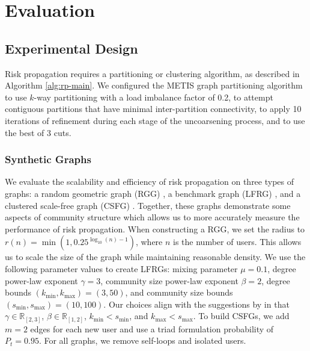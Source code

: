 \chapter{Evaluation}\label{sec:evaluation}

\section{Experimental Design}

\par Risk propagation requires a partitioning or clustering algorithm, as described in Algorithm \ref{alg:rp-main}. We configured the METIS graph partitioning algorithm \cite{Karypis1998} to use $k$-way partitioning with a load imbalance factor of 0.2, to attempt contiguous partitions that have minimal inter-partition connectivity, to apply 10 iterations of refinement during each stage of the uncoarsening process, and to use the best of 3 cuts.

\subsection{Synthetic Graphs}\label{sec:synthetic-eval}

\par We evaluate the scalability and efficiency of risk propagation on three types of graphs: a random geometric graph (RGG) \cite{Dall2002}, a benchmark graph (LFRG) \cite{Lancichinetti2008}, and a clustered scale-free graph (CSFG) \cite{Holme2002}. Together, these graphs demonstrate some aspects of community structure \cite{Fortunato2010} which allows us to more accurately measure the performance of risk propagation. When constructing a RGG, we set the radius to $r(n) = \min \left(1, 0.25^{\log_{10}(n) - 1}\right)$, where $n$ is the number of users. This allows us to scale the size of the graph while maintaining reasonable density. We use the following parameter values to create LFRGs: mixing parameter $\mu = 0.1$, degree power-law exponent $\gamma = 3$, community size power-law exponent $\beta = 2$, degree bounds $(k_{\min}, k_{\max}) = (3, 50)$, and community size bounds $(s_{\min}, s_{\max}) = (10, 100)$. Our choices align with the suggestions by \cite{Lancichinetti2008} in that $\gamma \in \mathbb{R}_{[2, 3]}$,  $\beta \in \mathbb{R}_{[1, 2]}$, $k_{\min} < s_{\min}$, and $k_{\max} < s_{\max}$. To build CSFGs, we add $m = 2$ edges for each new user and use a triad formulation probability of $P_t = 0.95$. For all graphs, we remove self-loops and isolated users.

